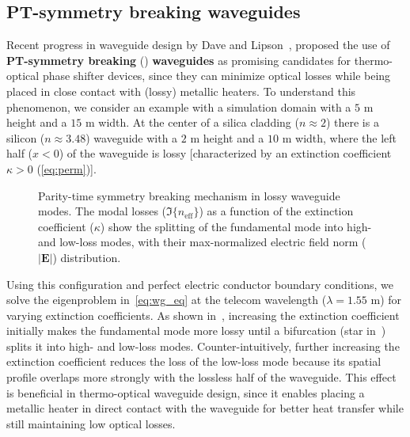  \subsection*{PT-symmetry breaking waveguides}
 Recent progress in waveguide design by Dave and Lipson~\cite{lipson}, proposed the use of \textbf{PT-symmetry breaking} () \textbf{waveguides} as promising candidates for
 thermo-optical phase shifter devices, since they can minimize optical losses while being placed in close contact with (lossy) metallic heaters. To understand this phenomenon, we consider an example with a 
 simulation domain with a $5$ \textmu m height and a $15$ \textmu m width. At the center of a silica cladding ($n\approx 2$) there is a silicon ($n \approx 3.48$) waveguide with a $2$ \textmu m height and 
 a $10$ \textmu m width, where the left half ($x<0$) of the waveguide is lossy [characterized by an extinction coefficient $\kappa>0$ (\eqref{eq:perm})].

\begin{figure}[tb]
    \centering
    \caption{Parity-time symmetry breaking mechanism in lossy waveguide modes. The modal losses ($\Im\{n_\text{eff}\}$) as a function of the extinction coefficient ($\kappa$) show the splitting of the fundamental mode into 
    high- and low-loss modes, with their max-normalized electric field norm ($\vert \mathbf{E} \vert$) distribution.}
    \label{fig:pt}
\end{figure}

Using this configuration and perfect electric conductor boundary conditions, we solve the eigenproblem in~\eqref{eq:wg_eq} at the telecom wavelength ($\lambda = 1.55$ \textmu m) for varying extinction coefficients. 
 As shown in~, increasing the extinction coefficient initially makes the fundamental mode more lossy until a bifurcation (star in~) splits
  it into high- and low-loss modes. Counter-intuitively, further increasing the extinction coefficient reduces the loss of the low-loss mode 
  because its spatial profile overlaps more strongly with the lossless half of the waveguide.
   This effect is beneficial in thermo-optical waveguide design, since it enables placing a metallic heater in direct contact with the waveguide for better heat transfer while still
    maintaining low optical losses.

